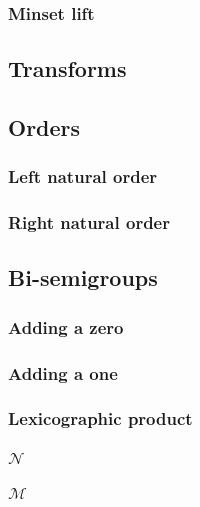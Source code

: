 \documentclass[10pt]{article}
\begin{document}
\subsubsection{Minset lift} 
\label{sec:minsetlift:def} 
 

\subsection{Transforms} 
\label{sec:transforms:def} 

\subsection{Orders} 
\label{sec:orders:def} 
\subsubsection{Left natural order}
\label{sec:llte:def} 
 
\subsubsection{Right natural order}
\label{sec:llte:def} 
 

\subsection{Bi-semigroups} 
\label{sec:bisemigroups:def} 
\subsubsection{Adding a zero} 
\label{sec:addzero:def} 
 
\subsubsection{Adding a one} 
\label{sec:addone:def} 
 
\subsubsection{Lexicographic product} 
\label{sec:bsllex:def} 
 
\subsubsection{$\mathcal{N}$}
\label{sec:bsN:def} 
 
\subsubsection{$\mathcal{M}$}
\label{sec:bsM:def} 
 
\end{document}
